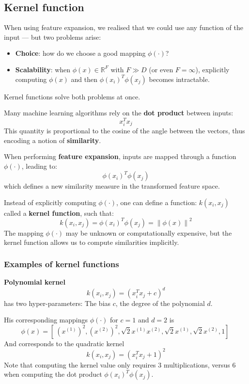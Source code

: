 \subsection{Kernel function}
When using feature expansion, we realised that we could use any function of the input — but two problems arise:
\begin{itemize}
  \item \textbf{Choice}: how do we choose a good mapping $\phi(\cdot)$?
  \item \textbf{Scalability}: when $\phi(x) \in \mathbb{R}^F$ with $F \gg D$ (or even $F = \infty$), explicitly computing $\phi(x)$ and then $\phi(x_i)^T\phi(x_j)$ becomes intractable.
\end{itemize}
Kernel functions solve both problems at once.

Many machine learning algorithms rely on the \textbf{dot product} between inputs:
\[
x_i^T x_j
\]
This quantity is proportional to the cosine of the angle between the vectors, thus encoding a notion of \textbf{similarity}.

When performing \textbf{feature expansion}, inputs are mapped through a function $\phi(\cdot)$, leading to:
\[
\phi(x_i)^T \phi(x_j)
\]
which defines a new similarity measure in the transformed feature space.

Instead of explicitly computing $\phi(\cdot)$, one can define a function:
$
k(x_i, x_j)
$
called a \textbf{kernel function}, such that:
\[
k(x_i, x_j) = \phi(x_i)^T \phi(x_j) = \left\|\phi(x)\right\|^2 
\]
The mapping $\phi(\cdot)$ may be unknown or computationally expensive, but the kernel function allows us to compute similarities implicitly.

\subsubsection{Examples of kernel functions}
\textbf{Polynomial kernel}
\[
  k(x_i,x_j) = (x_i^T x_j + c)^d
\]
has two hyper-parameters: The bias $c$, the degree of the polynomial $d$. 

His corresponding mappings $\phi(\cdot)$ for $c = 1$ and $d = 2$ is \[
  \phi(x) = [\ (x^{(1)})^2,(x^{(2)})^2,\sqrt{2} x^{(1)}x^{(2)}, \sqrt{2}x^{(1)}, \sqrt{2}x^{(2)}, 1]\
\]
And corresponds to the quadratic kernel \[
  k(x_i, x_j) = (x_i^T x_j + 1)^2
\]
Note that computing the kernel value only requires 3 multiplications,
versus 6 when computing the dot product $\phi(x_i)^T \phi(x_j)$.

